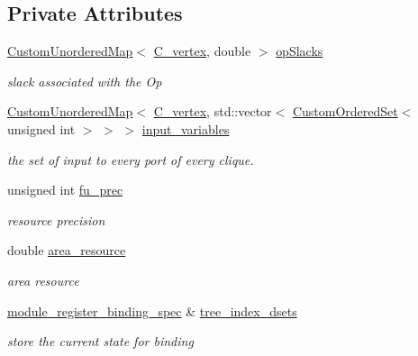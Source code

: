 \subsection*{Private Attributes}
\begin{DoxyCompactItemize}
\item 
\hyperlink{custom__map_8hpp_ad1ed68f2ff093683ab1a33522b144adc}{Custom\+Unordered\+Map}$<$ \hyperlink{clique__covering__graph_8hpp_a9cb45047ea8c5ed95a8cfa90494345aa}{C\+\_\+vertex}, double $>$ \hyperlink{structmodule__binding__check_a14a1f8fe4d8bdfd05bcaca161dac24d5}{op\+Slacks}
\begin{DoxyCompactList}\small\item\em slack associated with the Op \end{DoxyCompactList}\item 
\hyperlink{custom__map_8hpp_ad1ed68f2ff093683ab1a33522b144adc}{Custom\+Unordered\+Map}$<$ \hyperlink{clique__covering__graph_8hpp_a9cb45047ea8c5ed95a8cfa90494345aa}{C\+\_\+vertex}, std\+::vector$<$ \hyperlink{classCustomOrderedSet}{Custom\+Ordered\+Set}$<$ unsigned int $>$ $>$ $>$ \hyperlink{structmodule__binding__check_a1921afd62271b0fd65f29257665cee5b}{input\+\_\+variables}
\begin{DoxyCompactList}\small\item\em the set of input to every port of every clique. \end{DoxyCompactList}\item 
unsigned int \hyperlink{structmodule__binding__check_a7560c2ec26af0c7bbbee514ff2814299}{fu\+\_\+prec}
\begin{DoxyCompactList}\small\item\em resource precision \end{DoxyCompactList}\item 
double \hyperlink{structmodule__binding__check_a29a221e7901b9427dd37b8e213b19660}{area\+\_\+resource}
\begin{DoxyCompactList}\small\item\em area resource \end{DoxyCompactList}\item 
\hyperlink{classmodule__register__binding__spec}{module\+\_\+register\+\_\+binding\+\_\+spec} \& \hyperlink{structmodule__binding__check_ab73a32a396fa5af926ec38aae1252d22}{tree\+\_\+index\+\_\+dsets}
\begin{DoxyCompactList}\small\item\em store the current state for binding \end{DoxyCompactList}\item 

\end{DoxyCompactItemize}

